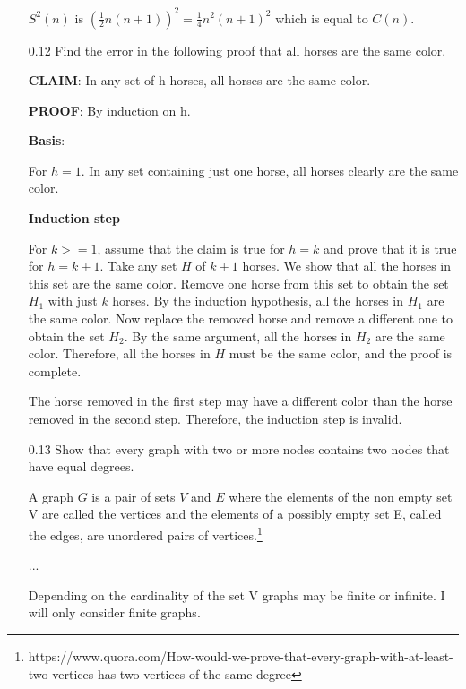 \begin{enumerate}
            $S^2(n)$ is $(\frac{1}{2} n(n+1))^2 = \frac{1}{4} n^2(n+1)^2$ which is equal to $C(n)$.
            
      \item[0.12]
            Find the error in the following proof that all horses are the same color.
            
            \textbf{CLAIM}: In any set of h horses, all horses are the same color.
            
            \textbf{PROOF}: By induction on h.
            
            \textbf{Basis}:
            
            For $h = 1$. In any set containing just one horse, all horses clearly are the same color.
            
            \textbf{Induction step}
            
            For $k >= 1$, assume that the claim is true for $h = k$ and prove that it is true for $h = k+1$. Take any set $H$ of $k+1$ horses. We show that all the horses in this set are the same color. Remove one horse from this set to obtain the set $H_1$ with just $k$ horses. By the induction hypothesis, all the horses in $H_1$ are the same color. Now replace the removed horse and remove a different one to obtain the set $H_2$. By the same argument, all the horses in $H_2$ are the same color. Therefore, all the horses in $H$ must be the same color, and the proof is complete.
            
            The horse removed in the first step may have a different color than the horse removed in the second step. Therefore, the induction step is invalid.
            
      \item[0.13]
            Show that every graph with two or more nodes contains two nodes that have equal degrees.
            
            A graph $G$ is a pair of sets $V$ and $E$ where the elements of the non empty set V are called the vertices and the elements of a possibly empty set E, called the edges, are unordered pairs of vertices.\footnote{https://www.quora.com/How-would-we-prove-that-every-graph-with-at-least-two-vertices-has-two-vertices-of-the-same-degree}
            
            ...
            
            Depending on the cardinality of the set V graphs may be finite or infinite. I will only consider finite graphs.
            

\end{enumerate}
